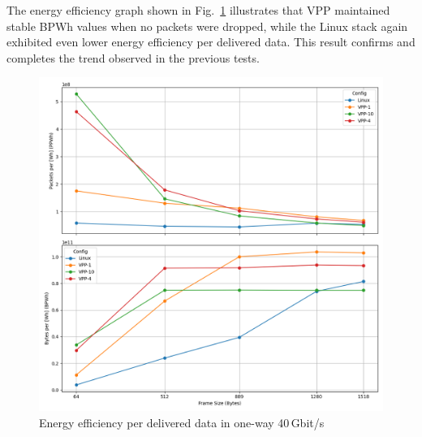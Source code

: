 The energy efficiency graph shown in Fig.~\ref{fig:40g} illustrates that VPP maintained stable BPWh values when no packets were dropped, 
while the Linux stack again exhibited even lower energy efficiency per delivered data.
This result confirms and completes the trend observed in the previous tests.


\begin{figure}[!htbp]
    \centering
    \includegraphics[width=\linewidth]{images/consumption-40g.png}
    \caption{Energy efficiency per delivered data in one-way 40\,Gbit/s}
    \label{fig:40g}
\end{figure}

